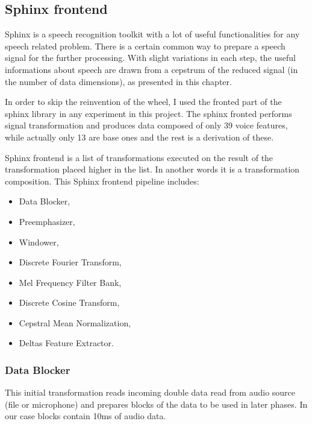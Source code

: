 \documentclass[12pt,a4paper,english]{article}
\begin{document}
\newpage
\subsection{Sphinx frontend}


Sphinx is a speech recognition toolkit with a lot of useful functionalities for any speech related problem.  \newline
There is a certain common way to prepare a speech signal for the further processing. With slight variations in each step, the useful informations about speech are drawn from a cepstrum of the reduced signal (in the number of data dimensions), as presented in this chapter. \newline

In order to skip the reinvention of the wheel, I used the fronted part of the sphinx library in any experiment in this project.
The sphinx fronted performs signal transformation and produces data composed of only 39 voice features,
while actually only 13 are base ones and the rest is a derivation of these. \newline

Sphinx frontend is a list of transformations executed on the result of the transformation placed higher in the list.
In another words it is a transformation composition. \newline
\newline
This Sphinx frontend pipeline includes: \newline
\begin{itemize}
	\item Data Blocker,
	\item Preemphasizer,
	\item Windower,
	\item Discrete Fourier Transform,
	\item Mel Frequency Filter Bank,
	\item Discrete Cosine Transform,
	\item Cepstral Mean Normalization,
	\item Deltas Feature Extractor.
\end{itemize}

\subsubsection{Data Blocker}

This initial transformation reads incoming double data read from audio source (file or microphone) and
prepares blocks of the data to be used in later phases. In our case blocks contain 10ms of audio data.
\end{document}
